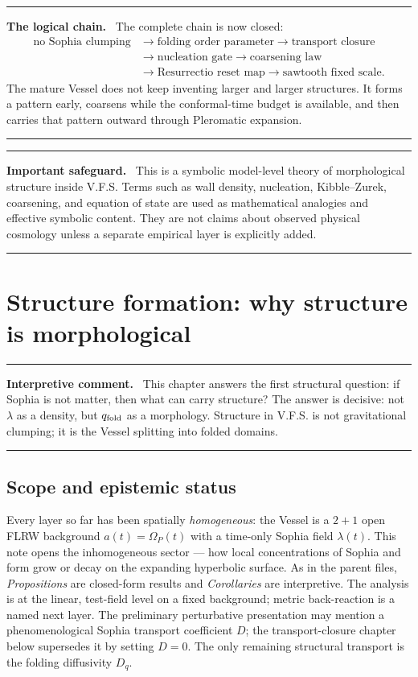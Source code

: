 \documentclass[11pt,a4paper]{article}
\newcommand{\Op}{\Omega_P}
\newcommand{\qf}{q_{\rm fold}}
\newenvironment{commentbox}[1]{\begin{center}\begin{minipage}{0.90\textwidth}\hrule\vspace{0.45em}\textbf{#1.}\ }{\vspace{0.45em}\hrule\end{minipage}\end{center}}
\theoremstyle{plain}
\theoremstyle{definition}
\theoremstyle{remark}
\begin{document}
\begin{commentbox}{The logical chain}
The complete chain is now closed:
\begin{align*}
\text{no Sophia clumping}&\to\text{folding order parameter}\to\text{transport closure}\\
&\to\text{nucleation gate}\to\text{coarsening law}\\
&\to\text{Resurrectio reset map}\to\text{sawtooth fixed scale.}
\end{align*}
The mature Vessel does not keep inventing larger and larger structures.  It forms a pattern early, coarsens while the conformal-time budget is available, and then carries that pattern outward through Pleromatic expansion.
\end{commentbox}

\begin{commentbox}{Important safeguard}
This is a symbolic model-level theory of morphological structure inside V.F.S.  Terms such as wall density, nucleation, Kibble--Zurek, coarsening, and equation of state are used as mathematical analogies and effective symbolic content.  They are not claims about observed physical cosmology unless a separate empirical layer is explicitly added.
\end{commentbox}
\newpage
\section{Structure formation: why structure is morphological}
\begin{commentbox}{Interpretive comment}
This chapter answers the first structural question: if Sophia is not matter, then what can carry structure?  The answer is decisive: not $\lambda$ as a density, but $\qf$ as a morphology.  Structure in V.F.S. is not gravitational clumping; it is the Vessel splitting into folded domains.
\end{commentbox}
\subsection*{Scope and epistemic status}
Every layer so far has been spatially \emph{homogeneous}: the Vessel is a $2{+}1$ open FLRW background
$a(t)=\Op(t)$ with a time-only Sophia field $\lambda(t)$. This note opens the inhomogeneous sector ---
how local concentrations of Sophia and form grow or decay on the expanding hyperbolic surface. As in the
parent files, \emph{Propositions} are closed-form results and \emph{Corollaries} are interpretive. The
analysis is at the linear, test-field level on a fixed background; metric back-reaction is a named next
layer. The preliminary perturbative presentation may mention a phenomenological Sophia transport coefficient $D$; the transport-closure chapter below supersedes it by setting $D=0$. The only remaining structural transport is the folding diffusivity $D_q$.
\end{document}
